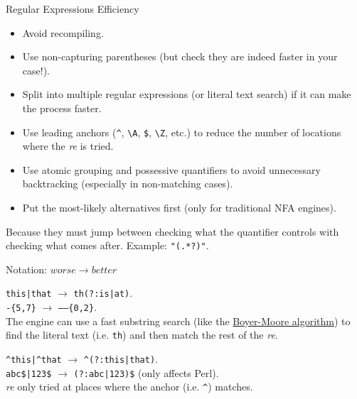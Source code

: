 \documentclass[11pt, a4paper, landscape]{scrartcl}
\newcommand{\regex}[1]{\texttt{#1}}
\newcommand{\cregex}[1]{\colorbox{gray!30}{\regex{#1}}}
\newcommand{\bs}{\textbackslash}
\newcommand{\re}{\textit{re}}
\begin{document}
\begin{cheatsheet}{Regular Expressions Efficiency}

\begin{col1}

\begin{itemize}
	\item Avoid recompiling.
	\item Use non-capturing parentheses (but check they are indeed faster in
		your case!).
	\item Split into multiple regular expressions (or literal text search) if
		it can make the process faster.
	\item Use leading anchors (\cregex{\^{}}, \cregex{\bs{}A}, \cregex{\$},
		\cregex{\bs{}Z}, etc.) to reduce the number of locations where the
		\re{} is tried.
	\item Use atomic grouping and possessive quantifiers to avoid unnecessary
		backtracking (especially in non-matching cases).
	\item Put the most-likely alternatives first (only for traditional NFA
		engines).
\end{itemize}


Because they must jump between checking what the quantifier controls with
checking what comes after. Example: \cregex{"(.*?)"}.

\end{col1}

\begin{col2}

Notation: $worse\to better$


\cregex{this|that} $\to$ \cregex{th(?:is|at)}.\\
\cregex{-\{5,7\}} $\to$ \cregex{------\{0,2\}}.\\
The engine can use a fast substring search (like the
\href{https://en.wikipedia.org/wiki/Boyer–Moore_string_search_algorithm}{Boyer-Moore algorithm}) to
find the literal text (i.e. \cregex{th}) and then match the rest of the \re.


\cregex{\^{}this|\^{}that} $\to$ \cregex{\^{}(?:this|that)}.\\
\cregex{abc\$|123\$} $\to$ \cregex{(?:abc|123)\$} (only affects Perl).\\
\re{} only tried at places where the anchor (i.e. \cregex{\^{}}) matches.


\end{col2}
\end{cheatsheet}
\end{document}
